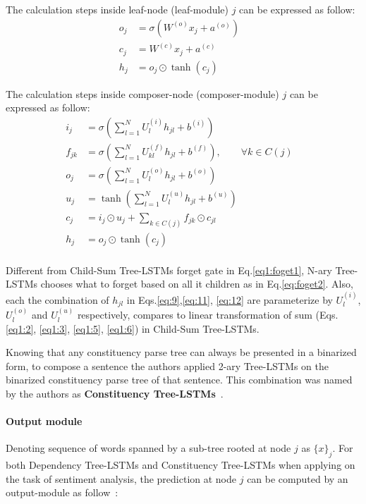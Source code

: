 The calculation steps inside leaf-node (leaf-module) \(j\) can be expressed as follow:
\begin{align}
    o_j &= \sigma{\left( W^{(o)} x_j + a^{\left(o\right)}\right)} & \\
       c_j &= W^{(c)} x_j + a^{(c)} & \\
    h_j &= o_j \odot \tanh{\left(c_j\right)} &
\end{align}

The calculation steps inside composer-node (composer-module) \(j\) can be expressed as follow:
\begin{align}
      i_j &= \sigma{ \left(\sum_{l=1}^{N}U_l^{(i)} h_{jl} + b^{(i)} \right) } &\label{eq:9}\\
      f_{jk} &= \sigma{\left(\sum_{l=1}^{N}U_{kl}^{\left(f\right)} h_{jl} + b^{\left(f\right)}\right)}, \qquad  \forall k \in C(j) & \label{eq:foget2}\\ 
      o_j &= \sigma{\left( \sum_{l=1}^{N}U_l^{\left(o\right)} h_{jl} + b^{\left(o\right)}\right)} &\label{eq:11}\\
      u_j &= \tanh{\left( \sum_{l=1}^{N}U_l^{\left(u\right)} h_{jl} + b^{\left(u\right)}\right)} &\label{eq:12}\\
       c_j &= i_j \odot u_j + \sum_{k \in C\left(j\right)} f_{jk} \odot c_{jl} & \\
    h_j &= o_j \odot \tanh{\left(c_j\right)} & \\
\end{align}

Different from Child-Sum Tree-LSTMs forget gate in Eq.\eqref{eq1:foget1}, N-ary Tree-LSTMs chooses what to forget based on all it children as in Eq.\eqref{eq:foget2}. 
Also, each the combination of \(h_{jl}\) in Eqs.\eqref{eq:9},\eqref{eq:11}, \eqref{eq:12} are parameterize by \(U_l^{(i)}\), \(U_l^{(o)}\) and \(U_l^{(u)}\) respectively, compares to linear transformation of sum (Eqs.\eqref{eq1:2}, \eqref{eq1:3}, \eqref{eq1:5}, \eqref{eq1:6}) in Child-Sum Tree-LSTMs.

Knowing that any constituency parse tree can always be presented in a binarized form, to compose a sentence the authors applied 2-ary Tree-LSTMs on the binarized constituency parse tree of that sentence. 
This combination was named by the authors as \textbf{Constituency Tree-LSTMs}~\cite{treeLSTM}.

\paragraph{Output module} Denoting sequence of words spanned by a sub-tree rooted at node \(j\) as \(\{x\}_j\). 
For both Dependency Tree-LSTMs and Constituency Tree-LSTMs when applying on the task of sentiment analysis, the prediction at node \(j\) can be computed by an output-module as follow~\cite{treeLSTM}:

